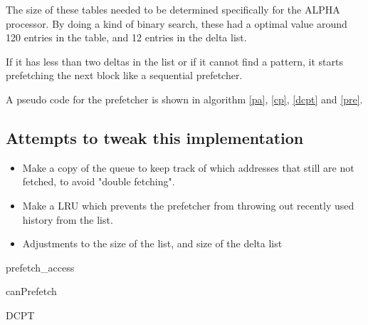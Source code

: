 \documentclass[12pt,journal,compsoc]{IEEEtran}
\begin{document}
The size of these tables needed to be determined specifically for the ALPHA processor. By doing a kind of binary search, these had a optimal value around 120 entries in the table, and 12 entries in the delta list.

If it has less than two deltas in the list or if it cannot find a pattern, it starts prefetching the next block like a sequential prefetcher.

A pseudo code for the prefetcher is shown in algorithm \ref{pa}, \ref{cp}, \ref{dcpt} and \ref{pre}.
\subsection{Attempts to tweak this implementation}
\begin{itemize}
\item Make a copy of the queue to keep track of which addresses that still are
not fetched, to avoid "double fetching".
\item Make a LRU which prevents the prefetcher from throwing out recently used history from the list.
\item Adjustments to the size of the list, and size of the delta list
\end{itemize}

\begin{algorithm}
\dontprintsemicolon
{}

\caption{prefetch\_access\label{pa}}
\end{algorithm}

\begin{algorithm}
\dontprintsemicolon
{}

\caption{canPrefetch\label{cp}}
\end{algorithm}

\begin{algorithm}
\dontprintsemicolon
{}

\caption{DCPT\label{dcpt}}
\end{algorithm}
\end{document}
